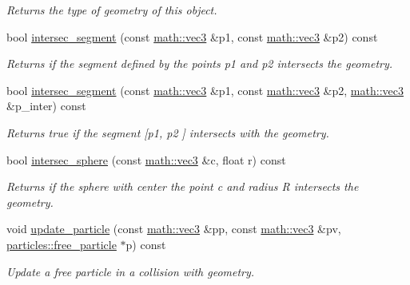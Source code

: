 \begin{DoxyCompactItemize}
\begin{DoxyCompactList}\small\item\em Returns the type of geometry of this object. \end{DoxyCompactList}\item 
bool \hyperlink{classphysim_1_1geometry_1_1sphere_a106a1a67f164c374c1b7e1d03670dd37}{intersec\+\_\+segment} (const \hyperlink{structphysim_1_1math_1_1vec3}{math\+::vec3} \&p1, const \hyperlink{structphysim_1_1math_1_1vec3}{math\+::vec3} \&p2) const
\begin{DoxyCompactList}\small\item\em Returns if the segment defined by the points {\itshape p1} and {\itshape p2} intersects the geometry. \end{DoxyCompactList}\item 
bool \hyperlink{classphysim_1_1geometry_1_1sphere_ae7053d0db9e787270ae1259fabcc8580}{intersec\+\_\+segment} (const \hyperlink{structphysim_1_1math_1_1vec3}{math\+::vec3} \&p1, const \hyperlink{structphysim_1_1math_1_1vec3}{math\+::vec3} \&p2, \hyperlink{structphysim_1_1math_1_1vec3}{math\+::vec3} \&p\+\_\+inter) const
\begin{DoxyCompactList}\small\item\em Returns true if the segment \mbox{[}{\itshape p1}, {\itshape p2} \mbox{]} intersects with the geometry. \end{DoxyCompactList}\item 
bool \hyperlink{classphysim_1_1geometry_1_1sphere_a98e47613f89ecb1214152fcdfa56e9ca}{intersec\+\_\+sphere} (const \hyperlink{structphysim_1_1math_1_1vec3}{math\+::vec3} \&c, float r) const
\begin{DoxyCompactList}\small\item\em Returns if the sphere with center the point {\itshape c} and radius {\itshape R} intersects the geometry. \end{DoxyCompactList}\item 
void \hyperlink{classphysim_1_1geometry_1_1sphere_adfea98b3611deb594d2598984fd6f9bb}{update\+\_\+particle} (const \hyperlink{structphysim_1_1math_1_1vec3}{math\+::vec3} \&pp, const \hyperlink{structphysim_1_1math_1_1vec3}{math\+::vec3} \&pv, \hyperlink{classphysim_1_1particles_1_1free__particle}{particles\+::free\+\_\+particle} $\ast$p) const
\begin{DoxyCompactList}\small\item\em Update a free particle in a collision with geometry. \end{DoxyCompactList}\item 

\end{DoxyCompactItemize}
